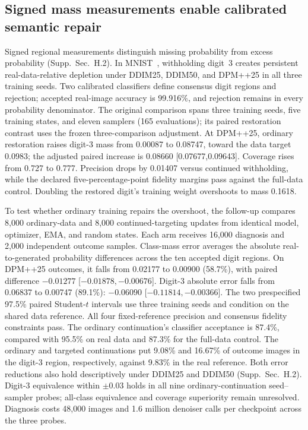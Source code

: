 \subsection{Signed mass measurements enable calibrated semantic repair}
\label{sec:mnist}
Signed regional measurements distinguish missing probability from excess
probability (Supp.~Sec.~H.2).
In MNIST~\cite{lecun1998mnist}, withholding digit~3 creates persistent
real-data-relative depletion under DDIM25, DDIM50, and DPM++25 in all three
training seeds. Two calibrated classifiers define consensus digit regions
and rejection; accepted real-image accuracy is 99.916\%, and rejection
remains in every probability denominator. The original comparison spans
three training seeds, five training states, and eleven samplers (165
evaluations); its paired restoration contrast uses the frozen
three-comparison adjustment. At DPM++25, ordinary restoration
raises digit-3 mass from 0.00087 to 0.08747, toward the data target 0.0983;
the adjusted paired increase is 0.08660 [0.07677,0.09643]. Coverage rises
from 0.727 to 0.777. Precision drops by 0.01407 versus continued withholding,
while the declared five-percentage-point fidelity margins pass against the
full-data control. Doubling the restored digit's training weight overshoots
to mass 0.1618.

To test whether ordinary training repairs the overshoot, the follow-up
compares 8,000 ordinary-data and 8,000 continued-targeting
updates from identical model, optimizer, EMA, and random states.
Each arm receives 16,000 diagnosis and 2,000 independent outcome samples.
Class-mass error averages the absolute real-to-generated probability
differences across the ten accepted digit regions.
On DPM++25 outcomes, it falls from 0.02177 to 0.00900 (58.7\%),
with paired difference $-0.01277$ [$-0.01878,-0.00676$]. Digit-3 absolute
error falls from 0.06837 to 0.00747 (89.1\%):
$-0.06090$ [$-0.11814,-0.00366$]. The two prespecified 97.5\% paired Student-$t$ intervals
use three training seeds and condition on the shared data reference.
All four fixed-reference precision and consensus fidelity constraints pass.
The ordinary continuation's classifier acceptance is 87.4\%, compared with
95.5\% on real data and 87.3\% for the full-data control.
The ordinary and targeted continuations put 9.08\% and 16.67\% of
outcome images in the digit-3 region, respectively, against 9.83\%
in the real reference. Both error reductions also hold descriptively
under DDIM25 and DDIM50 (Supp.~Sec.~H.2).
Digit-3 equivalence within $\pm0.03$ holds in all nine ordinary-continuation
seed--sampler probes; all-class equivalence and coverage superiority remain
unresolved. Diagnosis costs 48,000 images and 1.6 million denoiser calls
per checkpoint across the three probes.

